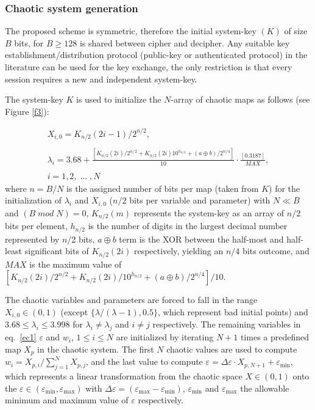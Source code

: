 \documentclass[preprint]{elsarticle}
\begin{document}
\subsubsection{Chaotic system generation}

The proposed scheme is symmetric, therefore the initial system-key $(K)$ of size $B$ bits, for $B \geq 128$ is shared between cipher and decipher. Any suitable key establishment/distribution protocol (public-key or authenticated protocol) in the literature can be used for the key exchange, the only restriction is that every session requires a new and independent system-key.

The system-key $K$ is used to initialize the $N$-array of chaotic maps as follows (see Figure \ref{f3}):

\begin{equation}
\begin{array}{l}
X_{i,0}= K_{n/2}(2i-1)/2^{n/2},
\\ \\
\displaystyle{
\lambda_{i}= 3.68+ \frac{[K_{n/2} (2i)/2^{n/2}+ K_{n/2}(2i)10^{h_{n/2}}+ (a \oplus b)/2^{n/4} ]}{10}\cdot \frac{[0.3187]}{MAX},
}
\\ \\
i = 1, 2, \; \ldots \;, N
\end{array}
\label{ec5}
\end{equation} 
where $n=B/N$ is the assigned number of bits per map (taken from $K$) for the initialization of $\lambda_{i}$ and $X_{i,0}$ ($n/2$ bits per variable and parameter) with $N \ll B$ and $(B \; mod \; N) = 0$, $K_{n/2}(m)$ represents the system-key as an array of $n/2$ bits per element, $h_{n/2}$ is the number of digits in the largest decimal number represented by $n/2$ bits, $a \oplus b$ term is the XOR between the half-most and half-least significant bits of $K_{n/2}(2i)$ respectively, yielding an $n/4$ bits outcome, and $MAX$ is the maximum value of $[K_{n/2}(2i)/2^{n/2} + K_{n/2}(2i)/10^{h_{n/2}} + (a \oplus b)/ 2^{n/4} ]/10$.


The chaotic variables and parameters are forced to fall in the range $X_{i,0} \in (0,1)$ (except $\{\lambda /(\lambda -1), 0.5\}$, which represent bad initial points) and $3.68 \leq \lambda_{i} \leq 3.998$ for $\lambda_{i} \neq \lambda_{j}$ and $i \neq j$ respectively. The remaining variables in eq.~\ref{ec1} $\varepsilon$ and $w_{i}$, $1 \leq i \leq N$ are initialized by iterating $N+1$ times a predefined map $X_{p}$ in the chaotic system. The first $N$ chaotic values are used to compute $w_{i}= X_{p,i} / \sum_{j=1}^{N}X_{p,j}$, and the last value to compute $\varepsilon= \Delta \varepsilon \cdot X_{p,N+1}+ \varepsilon _{\min}$, which represents a linear transformation from the chaotic space $X \in (0,1)$ onto the $\varepsilon \in (\varepsilon_{\min}, \varepsilon_{\max} )$  with $\Delta \varepsilon = (\varepsilon_{\max} - \varepsilon_{\min})$, $\varepsilon_{\min}$ and $\varepsilon_{\max}$ the allowable minimum and maximum value of $\varepsilon$ respectively.
\end{document}

